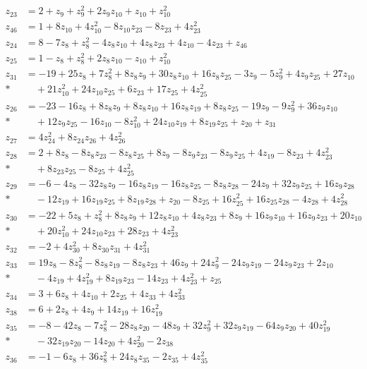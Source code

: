 \documentclass[11pt]{article}
\theoremstyle{remark}
\begin{document}
\begin{align*}
z_{23}&=2+z_{9}+z_{9}^{2}+2z_{9} z_{10}+z_{10}+z_{10}^{2}\\[3pt]
z_{46}&=1+8z_{10}+4z_{10}^{2}-8z_{10} z_{23}-8z_{23}+4z_{23}^{2}\\[3pt]
z_{24}&=8-7z_{8}+z_{8}^{2}-4z_{8} z_{10}+4z_{8} z_{23}+4z_{10}-4z_{23}+z_{46}\\[3pt]
z_{25}&=1-z_{8}+z_{8}^{2}+2z_{8} z_{10}-z_{10}+z_{10}^{2}\\[3pt]
z_{31}&=-19+25z_{8}+7z_{8}^{2}+8z_{8} z_{9}+30z_{8} z_{10}+16z_{8} z_{25}-3z_{9}-5z_{9}^{2}+4z_{9} z_{25}+27z_{10}\\*
&\quad{}+21z_{10}^{2}+24z_{10} z_{25}+6z_{23}+17z_{25}+4z_{25}^{2}\\[3pt]
z_{26}&=-23-16z_{8}+8z_{8} z_{9}+8z_{8} z_{10}+16z_{8} z_{19}+8z_{8} z_{25}-19z_{9}-9z_{9}^{2}+36z_{9} z_{10}\\*
&\quad{}+12z_{9} z_{25}-16z_{10}-8z_{10}^{2}+24z_{10} z_{19}+8z_{19} z_{25}+z_{20}+z_{31}\\[3pt]
z_{27}&=4z_{24}^{2}+8z_{24} z_{26}+4z_{26}^{2}\\[3pt]
z_{28}&=2+8z_{8}-8z_{8} z_{23}-8z_{8} z_{25}+8z_{9}-8z_{9} z_{23}-8z_{9} z_{25}+4z_{19}-8z_{23}+4z_{23}^{2}\\*
&\quad{}+8z_{23} z_{25}-8z_{25}+4z_{25}^{2}
\end{align*}
\begin{align*}
z_{29}&=-6-4z_{8}-32z_{8} z_{9}-16z_{8} z_{19}-16z_{8} z_{25}-8z_{8} z_{28}-24z_{9}+32z_{9} z_{25}+16z_{9} z_{28}\\*
&\quad{}-12z_{19}+16z_{19} z_{25}+8z_{19} z_{28}+z_{20}-8z_{25}+16z_{25}^{2}+16z_{25} z_{28}-4z_{28}+4z_{28}^{2}\\[3pt]
z_{30}&=-22+5z_{8}+z_{8}^{2}+8z_{8} z_{9}+12z_{8} z_{10}+4z_{8} z_{23}+8z_{9}+16z_{9} z_{10}+16z_{9} z_{23}+20z_{10}\\*
&\quad{}+20z_{10}^{2}+24z_{10} z_{23}+28z_{23}+4z_{23}^{2}\\[3pt]
z_{32}&=-2+4z_{30}^{2}+8z_{30} z_{31}+4z_{31}^{2}\\[3pt]
z_{33}&=19z_{8}-8z_{8}^{2}-8z_{8} z_{19}-8z_{8} z_{23}+46z_{9}+24z_{9}^{2}-24z_{9} z_{19}-24z_{9} z_{23}+2z_{10}\\*
&\quad{}-4z_{19}+4z_{19}^{2}+8z_{19} z_{23}-14z_{23}+4z_{23}^{2}+z_{25}\\[3pt]
z_{34}&=3+6z_{8}+4z_{10}+2z_{25}+4z_{33}+4z_{33}^{2}\\[3pt]
z_{38}&=6+2z_{8}+4z_{9}+14z_{19}+16z_{19}^{2}\\[3pt]
z_{35}&=-8-42z_{8}-7z_{8}^{2}-28z_{8} z_{20}-48z_{9}+32z_{9}^{2}+32z_{9} z_{19}-64z_{9} z_{20}+40z_{19}^{2}\\*
&\quad{}-32z_{19} z_{20}-14z_{20}+4z_{20}^{2}-2z_{38}\\[3pt]
z_{36}&=-1-6z_{8}+36z_{8}^{2}+24z_{8} z_{35}-2z_{35}+4z_{35}^{2}
\end{align*}
\end{document}
